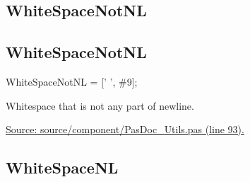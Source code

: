 \documentclass{report}
\newif\ifpdf
\begin{document}
\subsection*{\large{\textbf{WhiteSpaceNotNL}}\normalsize\hspace{1ex}\hrulefill}
\else
\subsection*{WhiteSpaceNotNL}
\fi
\label{PasDoc_Utils-WhiteSpaceNotNL}
\begin{list}{}{
\setlength{\itemindent}{0cm}
\setlength{\listparindent}{0cm}
\setlength{\leftmargin}{\evensidemargin}
\addtolength{\leftmargin}{\tmplength}
\settowidth{\labelsep}{X}
\addtolength{\leftmargin}{\labelsep}
\setlength{\labelwidth}{\tmplength}
}
\item[\textbf{Declaration}\hfill]
\ifpdf
\begin{flushleft}
\fi
\begin{ttfamily}
WhiteSpaceNotNL = [' ', {\#}9];\end{ttfamily}

\ifpdf
\end{flushleft}
\fi

\par
\item[\textbf{Description}]
Whitespace that is not any part of newline.\par
\href{https://github.com/pasdoc/pasdoc/blob/master/source/component/PasDoc_Utils.pas#L93}{Source: source/component/PasDoc{\_}Utils.pas (line 93).}

\end{list}
\ifpdf
\subsection*{\large{\textbf{WhiteSpaceNL}}\normalsize\hspace{1ex}\hrulefill}
\else
\end{document}
